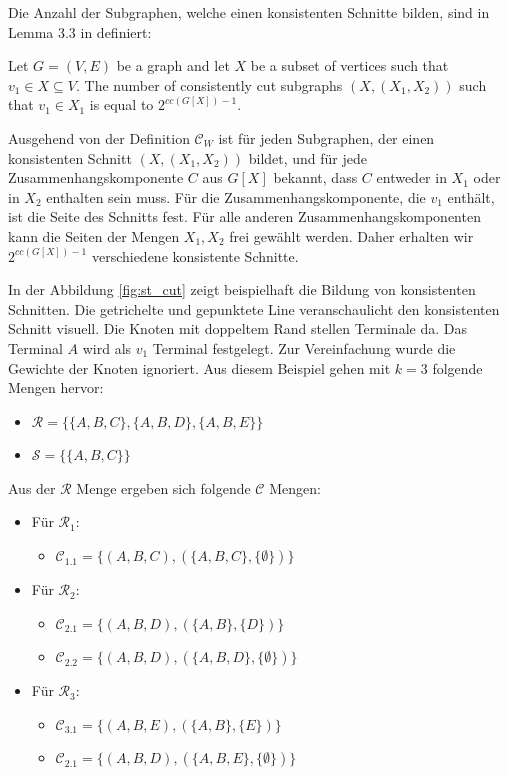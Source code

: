 Die Anzahl der Subgraphen, welche einen konsistenten Schnitte bilden, sind in Lemma 3.3 in \cite{cygan_solving_2011} definiert:

Let $G=(V,E)$ be a graph and let $X$ be a subset of vertices such that $v_1 \in X \subseteq V$. The number of consistently cut subgraphs $(X,(X_1,X_2))$ such that $v_1 \in X_1$ is equal to $2^{cc(G[X])-1}$.

Ausgehend von der Definition $\mathcal{C}_W$ ist für jeden Subgraphen, der einen konsistenten Schnitt $(X,(X_1,X_2))$ bildet, und für jede Zusammenhangskomponente $C$ aus $G[X]$ bekannt, dass  $C$ entweder in $X_1$ oder in $X_2$ enthalten sein muss. Für die Zusammenhangskomponente, die $v_1$ enthält, ist die Seite des Schnitts fest. Für alle anderen Zusammenhangskomponenten kann die Seiten der Mengen $X_1,X_2$ frei gewählt werden. Daher erhalten wir $2^{cc(G[X])-1}$ verschiedene konsistente Schnitte.

In der Abbildung \ref{fig:st_cut} zeigt beispielhaft die Bildung von konsistenten Schnitten. Die getrichelte und gepunktete Line veranschaulicht den konsistenten Schnitt visuell. Die Knoten mit doppeltem Rand stellen Terminale da. Das Terminal $A$ wird als $v_1$ Terminal festgelegt. Zur Vereinfachung wurde die Gewichte der Knoten ignoriert.
Aus diesem Beispiel gehen mit $k=3$ folgende Mengen hervor:
\begin{itemize}
\item $\mathcal{R} = \{\{A,B,C\}, \{A,B,D\}, \{A,B,E\}\}$
\item $\mathcal{S} = \{\{A,B,C\}\}$
\end{itemize}

Aus der $\mathcal{R}$ Menge ergeben sich folgende $\mathcal{C}$ Mengen:
\begin{itemize}
\item Für $\mathcal{R}_1$:
\begin{itemize}
\item $\mathcal{C}_{1.1} = \{(A,B,C),  (\{A,B,C\}, \{\emptyset\})\}$
\end{itemize}
\item Für $\mathcal{R}_2$:
\begin{itemize}
\item $\mathcal{C}_{2.1} = \{(A,B,D),  (\{A,B\}, \{D\})\}$
\item $\mathcal{C}_{2.2} = \{(A,B,D),  (\{A,B,D\}, \{\emptyset\})\}$ 
\end{itemize}
\item Für $\mathcal{R}_3$:
\begin{itemize}
\item $\mathcal{C}_{3.1} = \{(A,B,E),  (\{A,B\}, \{E\})\}$
\item $\mathcal{C}_{2.1} = \{(A,B,D),  (\{A,B,E\}, \{\emptyset\})\}$
\end{itemize}
\end{itemize}

